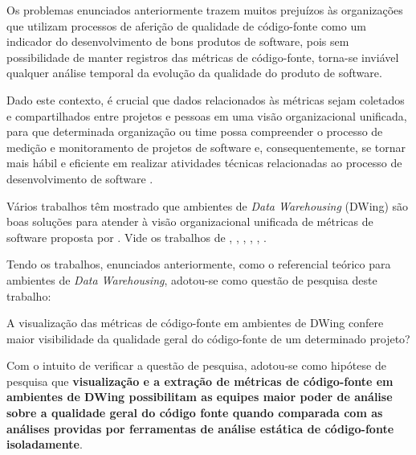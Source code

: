 Os problemas enunciados anteriormente trazem muitos prejuízos às organizações que 
utilizam processos de aferição de qualidade de código-fonte como um indicador do desenvolvimento de bons produtos de software, pois sem possibilidade de manter registros das métricas de código-fonte, torna-se inviável qualquer análise temporal da evolução da qualidade do produto de software. 

Dado este contexto, é crucial que dados relacionados às métricas sejam 
coletados e compartilhados entre projetos e pessoas em uma visão organizacional unificada, para que determinada organização ou time possa compreender o processo de medição e monitoramento de projetos de software e, 
consequentemente, se tornar mais hábil e eficiente em realizar atividades 
técnicas relacionadas ao processo de desenvolvimento de software 
\cite{Chulani2003}. 



Vários trabalhos têm mostrado que ambientes de \textit{Data Warehousing} 
(DWing) são boas soluções para atender à visão organizacional unificada de 
métricas de software proposta por . Vide os trabalhos 
de , , ,
, , . 

Tendo os trabalhos, enunciados anteriormente, como o referencial teórico para ambientes de \textit{Data Warehousing}, adotou-se como questão de pesquisa deste trabalho: 



\begin{questions}

	\item A visualização das métricas de código-fonte em ambientes de DWing confere maior visibilidade da qualidade geral do código-fonte de um determinado projeto?
	
\end{questions}


Com o intuito de verificar a questão de pesquisa, adotou-se como hipótese de pesquisa que \textbf{visualização e a extração 
de métricas de código-fonte em ambientes de DWing possibilitam as equipes maior poder de análise sobre a qualidade geral do código fonte quando comparada com as análises providas por ferramentas de análise estática de código-fonte isoladamente}. 







